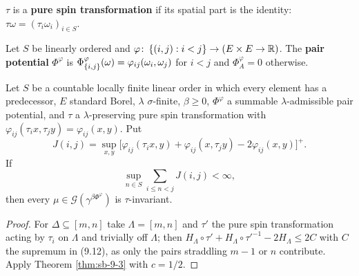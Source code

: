 \begin{definition}
    \label{def:sb-pure-spin}
    \leanok

    $\tau$ is a \textbf{pure spin transformation} if its spatial part is the identity:
    $\tau\omega = (\tau_i \omega_i)_{i \in S}$.
\end{definition}

\begin{definition}
    \label{def:sb-pair-potential}
    \leanok

    Let $S$ be linearly ordered and $\varphi \colon \left\{ (i,j) : i < j \right\} \to (E \times E \to \mathbb R)$.
    The \textbf{pair potential} $\Phi^\varphi$ is $\Phi^\varphi_{\left\{ i,j \right\}}(\omega)
    = \varphi_{ij}(\omega_i, \omega_j)$ for $i < j$ and $\Phi^\varphi_A = 0$ otherwise.
\end{definition}

\begin{theorem}[Georgii (9.11)]
    \label{thm:sb-9-11}
    \leanok

    Let $S$ be a countable locally finite linear order in which every element has a predecessor,
    $E$ standard Borel, $\lambda$ $\sigma$-finite, $\beta \geq 0$, $\Phi^\varphi$ a summable
    $\lambda$-admissible pair potential, and $\tau$ a $\lambda$-preserving pure spin
    transformation with $\varphi_{ij}(\tau_i x, \tau_j y) = \varphi_{ij}(x,y)$. Put
    \[
        J(i,j) = \sup_{x,y}\bigl[\varphi_{ij}(\tau_i x, y) + \varphi_{ij}(x, \tau_j y)
            - 2\varphi_{ij}(x,y)\bigr]^+ .
    \]
    If
    \[
        \sup_{n \in S} \sum_{i \leq n < j} J(i,j) < \infty, \tag{9.12}
    \]
    then every $\mu \in \mathcal G(\gamma^{\beta\Phi^\varphi})$ is $\tau$-invariant.
\end{theorem}
\begin{proof}
    \leanok
    For $\Delta \subseteq [m, n]$ take $\Lambda = [m,n]$ and $\tau'$ the pure spin transformation
    acting by $\tau_i$ on $\Lambda$ and trivially off $\Lambda$; then
    $H_\Lambda \circ \tau' + H_\Lambda \circ \tau'^{-1} - 2 H_\Lambda \leq 2 C$ with $C$ the
    supremum in (9.12), as only the pairs straddling $m - 1$ or $n$ contribute. Apply Theorem
    \ref{thm:sb-9-3} with $c = 1/2$.
\end{proof}

